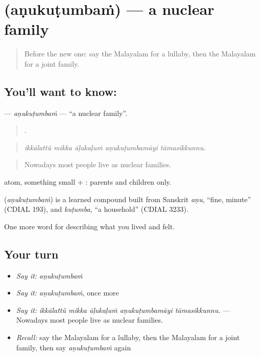 \section[\texorpdfstring{\ml{അണുകുടുംബം} (aṇukuṭumbaṁ)}{അണുകുടുംബം (aṇukuṭumbaṁ)}]{ (aṇukuṭumbaṁ) — a nuclear family}

\label{lesson:ML-C555-anukutumbam}



\begin{quote}
Before the new one: say the Malayalam for a lullaby, then the Malayalam for a joint family.
\end{quote}

\subsection*{You'll want to know: }
\textbf{} — \emph{aṇukuṭumbaṁ} — \textquotedblleft{}a nuclear family\textquotedblright{}.

\begin{quote}
    .
\end{quote}

\begin{quote}
\emph{ikkālattŭ mikka āḷukaḷuṁ aṇukuṭumbamāyi tāmasikkunnu.}
\end{quote}

\begin{quote}
Nowadays most people live as nuclear families.
\end{quote}

 atom, something small + : parents and children only.

\begin{cousinweb}
\textbf{} (\emph{aṇukuṭumbaṁ}) is a learned compound built from Sanskrit \emph{aṇu}, \textquotedblleft{}fine, minute\textquotedblright{} (CDIAL 193), and \emph{kuṭumba}, \textquotedblleft{}a household\textquotedblright{} (CDIAL 3233).
\end{cousinweb}

\begin{grammarlens}[title={What you've built}]
One more word for describing what you lived and felt.
\end{grammarlens}

\subsection*{Your turn}
\begin{itemize}
\raggedright
  \item \emph{Say it:} \emph{aṇukuṭumbaṁ}
  \item \emph{Say it:} \emph{aṇukuṭumbaṁ}, once more
  \item \emph{Say it:} \emph{ikkālattŭ mikka āḷukaḷuṁ aṇukuṭumbamāyi tāmasikkunnu.} — Nowadays most people live as nuclear families.
  \item \emph{Recall:} say the Malayalam for a lullaby, then the Malayalam for a joint family, then say \emph{aṇukuṭumbaṁ} again
\end{itemize}

